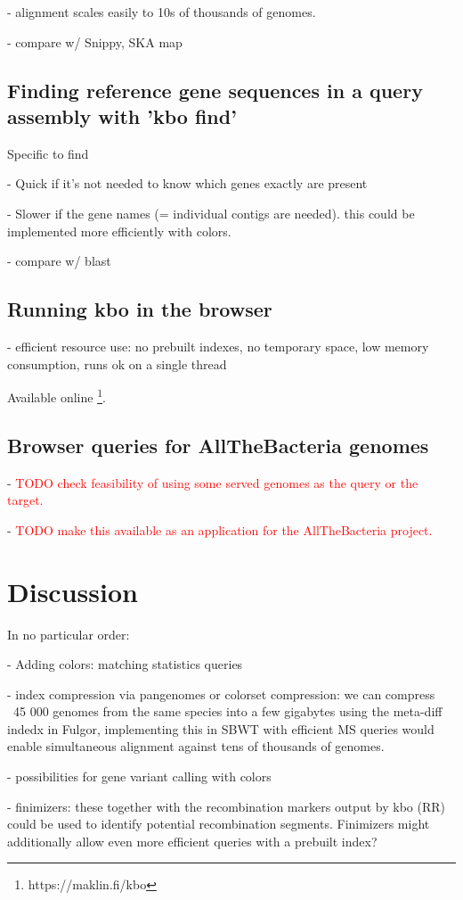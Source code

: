 \documentclass[unnumsec,webpdf,contemporary,large]{oup-authoring-template}%
\theoremstyle{thmstyleone}%
\theoremstyle{thmstyletwo}%
\theoremstyle{thmstylethree}%
\begin{document}
- alignment scales easily to 10s of thousands of genomes.

- compare w/ Snippy, SKA map

\subsection{Finding reference gene sequences in a query assembly with 'kbo find'}

Specific to  find

- Quick if it's not needed to know which genes exactly are present

- Slower if the gene names (= individual contigs are needed). this could be implemented more efficiently with colors.

- compare w/ blast

\subsection{Running kbo in the browser}
- efficient resource use: no prebuilt indexes, no temporary space, low memory consumption, runs ok on a single thread

Available online \footnote{https://maklin.fi/kbo}.

\subsection{Browser queries for AllTheBacteria genomes}
- \textcolor{red}{TODO check feasibility of using some served genomes as the query or the target.}

\noindent- \textcolor{red}{TODO make this available as an application for the AllTheBacteria project.}


\section{Discussion}
In no particular order:

- Adding colors: matching statistics queries

- index compression via pangenomes or colorset compression: we can compress ~45 000 genomes from the same species into a few gigabytes using the meta-diff indedx in Fulgor, implementing this in SBWT with efficient MS queries would enable simultaneous alignment against tens of thousands of genomes.

- possibilities for gene variant calling with colors

- finimizers: these together with the recombination markers output by {\sf kbo} (RR) could be used to identify potential recombination segments. Finimizers might additionally allow even more efficient queries with a prebuilt index?
\end{document}
